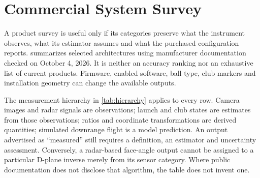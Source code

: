 \chapter{Commercial System Survey}
\label{ch:survey}
\nocite{fccTman4,flightscopebgh,foresighthmt,garminr10accuracy,garminr10data,mevoteardown,mygolfspymlm2pro,uneekordimple,uneekorphotometric,us12401909,playbetterblp}

A product survey is useful only if its categories preserve what the instrument observes, what its estimator assumes and what the purchased configuration reports.
 summarizes selected architectures using manufacturer documentation checked on October 4, 2026.
It is neither an accuracy ranking nor an exhaustive list of current products.
Firmware, enabled software, ball type, club markers and installation geometry can change the available outputs.

The measurement hierarchy in \cref{tab:hierarchy} applies to every row.
Camera images and radar signals are observations; launch and club states are estimates from those observations; ratios and coordinate transformations are derived quantities; simulated downrange flight is a model prediction.
An output advertised as ``measured'' still requires a definition, an estimator and uncertainty assessment.
Conversely, a radar-based face-angle output cannot be assigned to a particular D-plane inverse merely from its sensor category.
Where public documentation does not disclose that algorithm, the table does not invent one.

